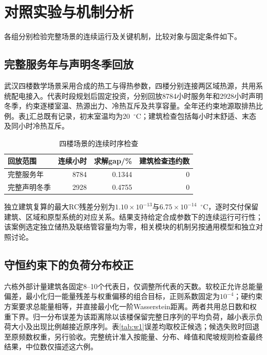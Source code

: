 \section{对照实验与机制分析}
各组分别检验完整场景的连续运行及关键机制，比较对象与固定条件如下。
\subsection{完整服务年与声明冬季回放}

武汉四楼数学场景采用合成的热工与得热参数，四楼分别连接两区域热源，共用系统配电接入。代表时段规划后固定投资，分别回放8784小时服务年和2928小时声明冬季，约束逐楼室温、热源出力、冷热互斥及共享容量。全年还约束地源取排热比例。表\ref{tab:continuous-scope}汇总既有记录，初末室温均为20~$^\circ$C；建筑检查包括每小时末舒适、末态及同小时冷热互斥。

\begin{table}[htbp]
\centering
\caption{四楼场景的连续时序检查}\label{tab:continuous-scope}
\begin{tabularx}{\textwidth}{@{}Xrrr@{}}
\toprule
回放范围 & 连续小时 & 求解gap/\% & 建筑检查违约数\\
\midrule
完整服务年 & 8784 & 0.1344 & 0\\
完整声明冬季 & 2928 & 0.4755 & 0\\
\bottomrule
\end{tabularx}
\end{table}

独立建筑复算的最大RC残差分别为$1.10\times10^{-13}$与$6.75\times10^{-14}$~$^\circ$C，逐时交付保留建筑、区域和原型系统的对应关系。结果支持给定合成参数下的连续运行可行性；该案例选定独立储热及联络管容量均为零，相关模块的机制另按通用模型和独立对照讨论。

\subsection{守恒约束下的负荷分布校正}

六栋外部计量建筑各固定8--10个代表日，仅调整所代表的天数。软校正允许总能量偏差，最小化归一能量残差与权重偏移的组合目标，正则系数固定为$10^{-4}$；硬约束方案要求总能量相等，并直接最小化一阶Wasserstein距离。两者共用总日数和权重下界。归一分布误差为该距离除以该楼保留完整日序列的平均负荷，越小表示负荷大小及出现比例越接近原序列。表\ref{tab:w1}误差均取校正候选；候选失败时回退至原频数权重，另行验收。完整统计准入按能量、分布、峰值和爬坡规则检查最终结果，中位数仅描述这六例。


